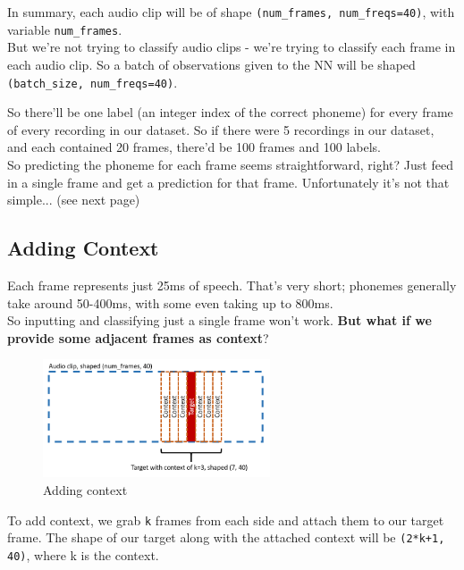 \documentclass{article}
\newcommand{\ttt}[1]{\texttt{#1}}
\begin{document}
In summary, each audio clip will be of shape \ttt{(num\_frames, num\_freqs=40)}, with variable \ttt{num\_frames}. \\

But we're not trying to classify audio clips - we're trying to classify each frame in each audio clip. So a batch of observations given to the NN will be shaped \ttt{(batch\_size, num\_freqs=40)}.

So there'll be one label (an integer index of the correct phoneme) for every frame of every recording in our dataset. So if there were 5 recordings in our dataset, and each contained 20 frames, there'd be 100 frames and 100 labels. \\

So predicting the phoneme for each frame seems straightforward, right? Just feed in a single frame and get a prediction for that frame. Unfortunately it's not that simple... (see next page)

\newpage

\subsection{Adding Context}

Each frame represents just 25ms of speech. That's very short; phonemes generally take around 50-400ms, with some even taking up to 800ms. \\

So inputting and classifying just a single frame won't work. \textbf{But what if we provide some adjacent frames as context}? \\

\begin{figure}[h]
    \centering
    \includegraphics[width=0.6\textwidth]{images/context.png}
    \caption{Adding context}
\end{figure}

To add context, we grab \ttt{k} frames from each side and attach them to our target frame. The shape of our target along with the attached context will be \ttt{(2*k+1, 40)}, where k is the context. \\
\end{document}
